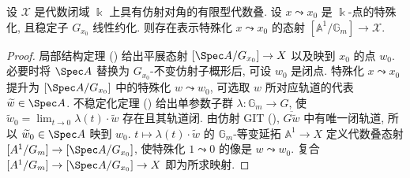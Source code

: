 \begin{corollary}[不稳定化定理 II]\label{src:8.3.8}
设 $\mathcal X$ 是代数闭域 $\Bbbk$ 上具有仿射对角的有限型代数叠. 设 $x\leadsto x_0$ 是 $\Bbbk$-点的特殊化, 且稳定子 $G_{x_0}$ 线性约化. 则存在表示特殊化 $x\leadsto x_0$ 的态射 $[\mathbb A^1/\mathbb G_m]\to\mathcal X$.
\end{corollary}
\begin{proof}
局部结构定理 () 给出平展态射 $[\Spec A/G_{x_0}]\to\mathcal X$ 以及映到 $x_0$ 的点 $w_0$. 必要时将 $\Spec A$ 替换为 $G_{x_0}$-不变仿射子概形后, 可设 $w_0$ 是闭点. 特殊化 $x\leadsto x_0$ 提升为 $[\Spec A/G_{x_0}]$ 中的特殊化 $w\leadsto w_0$, 可选取 $w$ 所对应轨道的代表 $\widetilde w\in\Spec A$. 不稳定化定理 () 给出单参数子群 $\lambda:\mathbb G_m\to G$, 使 $\widetilde w_0=\lim_{t\to0}\lambda(t)\cdot\widetilde w$ 存在且其轨道闭. 由仿射 GIT (), $\overline{G\widetilde w}$ 中有唯一闭轨道, 所以 $\widetilde w_0\in\Spec A$ 映到 $w_0$. $t\mapsto\lambda(t)\cdot\widetilde w$ 的 $\mathbb G_m$-等变延拓 $\mathbb A^1\to X$ 定义代数叠态射 $[\mathbb A^1/\mathbb G_m]\to[\Spec A/G_{x_0}]$, 使特殊化 $1\leadsto0$ 的像是 $w\leadsto w_0$. 复合 $[\mathbb A^1/\mathbb G_m]\to[\Spec A/G_{x_0}]\to\mathcal X$ 即为所求映射.
\end{proof}
